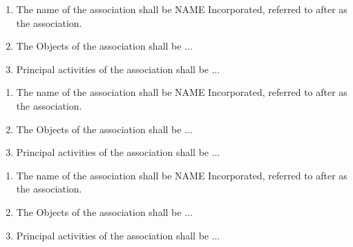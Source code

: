 \begin{enumerate}
    \item The name of the association shall be NAME Incorporated, referred to after as the association.
    \item The Objects of the association shall be ...
    \item Principal activities of the association shall be ...
\end{enumerate}

\begin{enumerate}
    \item The name of the association shall be NAME Incorporated, referred to after as the association.
    \item The Objects of the association shall be ...
    \item Principal activities of the association shall be ...
\end{enumerate}

\begin{enumerate}
    \item The name of the association shall be NAME Incorporated, referred to after as the association.
    \item The Objects of the association shall be ...
    \item Principal activities of the association shall be ...
\end{enumerate}